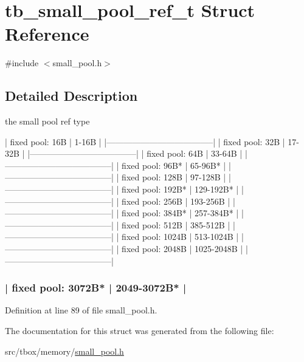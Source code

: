 \hypertarget{structtb__small__pool__ref__t}{\section{tb\-\_\-small\-\_\-pool\-\_\-ref\-\_\-t Struct Reference}
\label{structtb__small__pool__ref__t}
}


{\ttfamily \#include $<$small\-\_\-pool.\-h$>$}



\subsection{Detailed Description}
the small pool ref type


\begin{DoxyPre}



|    fixed pool: 16B    |  1-16B       | 
|--------------------------------------|
|    fixed pool: 32B    |  17-32B      |  
|--------------------------------------|
|    fixed pool: 64B    |  33-64B      | 
|--------------------------------------|
|    fixed pool: 96B*   |  65-96B*     | 
|--------------------------------------|
|    fixed pool: 128B   |  97-128B     |  
|--------------------------------------|
|    fixed pool: 192B*  |  129-192B*   |  
|--------------------------------------|
|    fixed pool: 256B   |  193-256B    |  
|--------------------------------------|
|    fixed pool: 384B*  |  257-384B*   |  
|--------------------------------------|
|    fixed pool: 512B   |  385-512B    |  
|--------------------------------------|
|    fixed pool: 1024B  |  513-1024B   |  
|--------------------------------------|
|    fixed pool: 2048B  |  1025-2048B  |  
|--------------------------------------|
\subsubsection*{|    fixed pool: 3072B* |  2049-3072B* |  
}\end{DoxyPre}



\begin{DoxyPre}\end{DoxyPre}



\begin{DoxyPre}\end{DoxyPre}
 

Definition at line 89 of file small\-\_\-pool.\-h.



The documentation for this struct was generated from the following file\-:\begin{DoxyCompactItemize}
\item 
src/tbox/memory/\hyperlink{small__pool_8h}{small\-\_\-pool.\-h}\end{DoxyCompactItemize}
